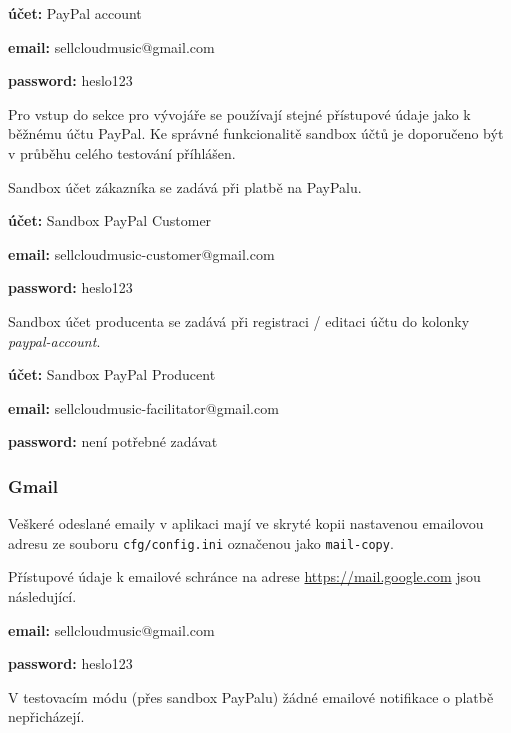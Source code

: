 \documentclass[12pt]{article}
\begin{document}
\begin{description}
\item{\textbf{účet:}} PayPal account
\item{\textbf{email:}} sellcloudmusic@gmail.com
\item{\textbf{password:}} heslo123
\end{description}

Pro vstup do sekce pro vývojáře se používají stejné přístupové údaje jako k běžnému účtu PayPal.
Ke správné funkcionalitě sandbox účtů je doporučeno být v průběhu celého testování příhlášen.\newline

Sandbox účet zákazníka se zadává při platbě na PayPalu.
\begin{description}
\item{\textbf{účet:}} Sandbox PayPal Customer
\item{\textbf{email:}} sellcloudmusic-customer@gmail.com
\item{\textbf{password:}} heslo123
\end{description}

Sandbox účet producenta se zadává při registraci / editaci účtu do kolonky \emph{paypal-account}.
\begin{description}
\item{\textbf{účet:}} Sandbox PayPal Producent
\item{\textbf{email:}} sellcloudmusic-facilitator@gmail.com
\item{\textbf{password:}} není potřebné zadávat
\end{description}

\subsubsection{Gmail}

Veškeré odeslané emaily v aplikaci mají ve skryté kopii nastavenou emailovou adresu ze souboru \texttt{cfg/config.ini} označenou jako \texttt{mail-copy}.\newline

Přístupové údaje k emailové schránce na adrese \url{https://mail.google.com} jsou následující.
\begin{description}
\item{\textbf{email:}} sellcloudmusic@gmail.com
\item{\textbf{password:}} heslo123
\end{description}

V testovacím módu (přes sandbox PayPalu) žádné emailové notifikace o platbě nepřicházejí.
\end{document}
